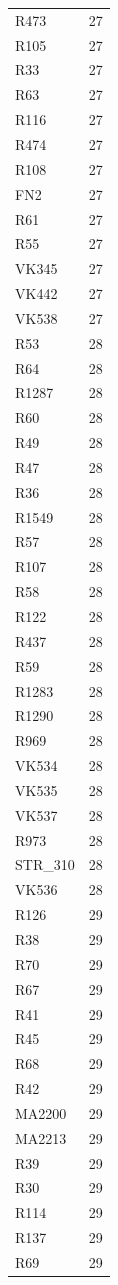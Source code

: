 \begin{longtable}[t]{ll}
R473 & 27\\
R105 & 27\\
R33 & 27\\
R63 & 27\\
R116 & 27\\
R474 & 27\\
R108 & 27\\
FN2 & 27\\
R61 & 27\\
R55 & 27\\
VK345 & 27\\
VK442 & 27\\
VK538 & 27\\
R53 & 28\\
R64 & 28\\
R1287 & 28\\
R60 & 28\\
R49 & 28\\
R47 & 28\\
R36 & 28\\
R1549 & 28\\
R57 & 28\\
R107 & 28\\
R58 & 28\\
R122 & 28\\
R437 & 28\\
R59 & 28\\
R1283 & 28\\
R1290 & 28\\
R969 & 28\\
VK534 & 28\\
VK535 & 28\\
VK537 & 28\\
R973 & 28\\
STR\_310 & 28\\
VK536 & 28\\
R126 & 29\\
R38 & 29\\
R70 & 29\\
R67 & 29\\
R41 & 29\\
R45 & 29\\
R68 & 29\\
R42 & 29\\
MA2200 & 29\\
MA2213 & 29\\
R39 & 29\\
R30 & 29\\
R114 & 29\\
R137 & 29\\
R69 & 29\\

\end{longtable}
